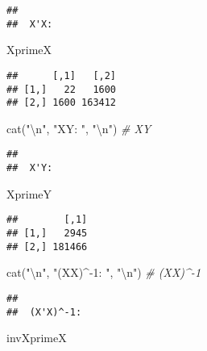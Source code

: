 \documentclass[
]{article}
\newenvironment{Shaded}{\begin{snugshade}}{\end{snugshade}}
\newcommand{\CommentTok}[1]{\textcolor[rgb]{0.56,0.35,0.01}{\textit{#1}}}
\newcommand{\FunctionTok}[1]{\textcolor[rgb]{0.00,0.00,0.00}{#1}}
\newcommand{\NormalTok}[1]{#1}
\newcommand{\SpecialCharTok}[1]{\textcolor[rgb]{0.00,0.00,0.00}{#1}}
\newcommand{\StringTok}[1]{\textcolor[rgb]{0.31,0.60,0.02}{#1}}
\begin{document}
\begin{verbatim}
## 
##  X'X:
\end{verbatim}

\begin{Shaded}
\begin{Highlighting}[]
\NormalTok{XprimeX}
\end{Highlighting}
\end{Shaded}

\begin{verbatim}
##      [,1]   [,2]
## [1,]   22   1600
## [2,] 1600 163412
\end{verbatim}

\begin{Shaded}
\begin{Highlighting}[]
\FunctionTok{cat}\NormalTok{(}\StringTok{"}\SpecialCharTok{\textbackslash{}n}\StringTok{"}\NormalTok{, }\StringTok{"X\textquotesingle{}Y: "}\NormalTok{, }\StringTok{"}\SpecialCharTok{\textbackslash{}n}\StringTok{"}\NormalTok{) }\CommentTok{\# X\textquotesingle{}Y}
\end{Highlighting}
\end{Shaded}

\begin{verbatim}
## 
##  X'Y:
\end{verbatim}

\begin{Shaded}
\begin{Highlighting}[]
\NormalTok{XprimeY}
\end{Highlighting}
\end{Shaded}

\begin{verbatim}
##        [,1]
## [1,]   2945
## [2,] 181466
\end{verbatim}

\begin{Shaded}
\begin{Highlighting}[]
\FunctionTok{cat}\NormalTok{(}\StringTok{"}\SpecialCharTok{\textbackslash{}n}\StringTok{"}\NormalTok{, }\StringTok{"(X\textquotesingle{}X)\^{}{-}1: "}\NormalTok{, }\StringTok{"}\SpecialCharTok{\textbackslash{}n}\StringTok{"}\NormalTok{) }\CommentTok{\# (X\textquotesingle{}X)\^{}{-}1}
\end{Highlighting}
\end{Shaded}

\begin{verbatim}
## 
##  (X'X)^-1:
\end{verbatim}

\begin{Shaded}
\begin{Highlighting}[]
\NormalTok{invXprimeX}
\end{Highlighting}
\end{Shaded}
\end{document}
